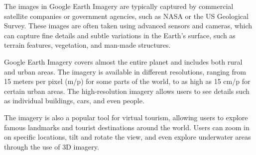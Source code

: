 The images in Google Earth Imagery are typically captured by commercial satellite companies or government agencies, such as NASA or the US Geological Survey. These images are often taken using advanced sensors and cameras, which can capture fine details and subtle variations in the Earth's surface, such as terrain features, vegetation, and man-made structures.

Google Earth Imagery covers almost the entire planet and includes both rural and urban areas. The imagery is available in different resolutions, ranging from 15 meters per pixel (m/p) for some parts of the world, to as high as 15 cm/p for certain urban areas. The high-resolution imagery allows users to see details such as individual buildings, cars, and even people.

The imagery is also a popular tool for virtual tourism, allowing users to explore famous landmarks and tourist destinations around the world. Users can zoom in on specific locations, tilt and rotate the view, and even explore underwater areas through the use of 3D imagery.



